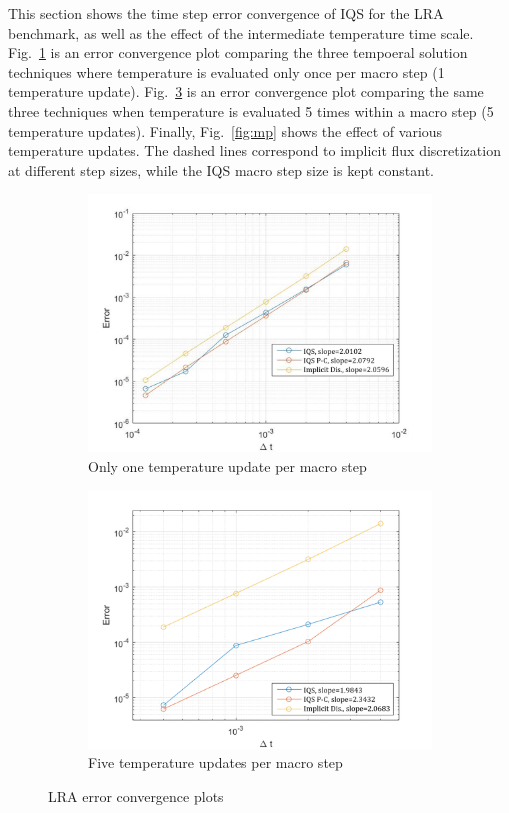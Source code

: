 \documentclass{elsarticle}
\newcommand{\fig}[1]{Fig.~\ref{#1}}                      %
\begin{document}
This section shows the time step error convergence of IQS for the LRA benchmark, as well as the effect of the intermediate temperature time scale. \fig{fig:lra_bad} is an error convergence plot comparing the three tempoeral solution techniques where temperature is evaluated only once per macro step (1 temperature update).  \fig{fig:lra_mpconv} is an error convergence plot comparing the same three techniques when temperature is evaluated 5 times within a macro step (5 temperature updates).  Finally, \fig{fig:mp} shows the effect of various temperature updates. The dashed lines correspond to implicit flux discretization at different step sizes, while the IQS macro step size is kept constant.

\begin{figure}[!htbp]
\centering
\begin{subfigure}[!htbp]{0.49\textwidth}
\includegraphics[width=\textwidth]{figures/lra_bad.png}
\caption{Only one temperature update per macro step}
\label{fig:lra_bad}
\end{subfigure}
\begin{subfigure}[!htbp]{0.49\textwidth}
\includegraphics[width=\textwidth]{figures/lra_mp_convergence.png}
\caption{Five temperature updates per macro step}
\label{fig:lra_mpconv}
\end{subfigure}
\caption{LRA error convergence plots}
\end{figure}
\end{document}
